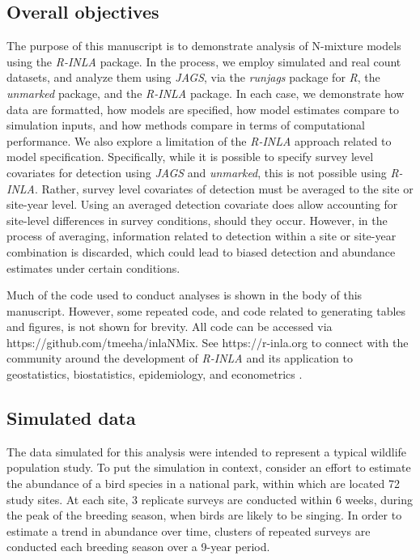 \documentclass{article}
\begin{document}
\subsection[Overall objectives]{Overall objectives}
The purpose of this manuscript is to demonstrate analysis of N-mixture models using the \emph{R-INLA} package. In the process, we employ simulated and real count datasets, and analyze them using \emph{JAGS}, via the \emph{runjags} package \citep{Denwood_2016} for \emph{R}, the \emph{unmarked} package, and the \emph{R-INLA} package. In each case, we demonstrate how data are formatted, how models are specified, how model estimates compare to simulation inputs, and how methods compare in terms of computational performance. We also explore a limitation of the \emph{R-INLA} approach related to model specification. Specifically, while it is possible to specify survey level covariates for detection using \emph{JAGS} and \emph{unmarked}, this is not possible using \emph{R-INLA}. Rather, survey level covariates of detection must be averaged to the site or site-year level. Using an averaged detection covariate does allow accounting for site-level differences in survey conditions, should they occur. However, in the process of averaging, information related to detection within a site or site-year combination is discarded, which could lead to biased detection and abundance estimates under certain conditions.

Much of the code used to conduct analyses is shown in the body of this manuscript. However, some repeated code, and code related to generating tables and figures, is not shown for brevity. All code can be accessed via https://github.com/tmeeha/inlaNMix. See https://r-inla.org to connect with the community around the development of \emph{R-INLA} and its application to geostatistics, biostatistics, epidemiology, and econometrics \citep{Lindgren_Rue_2015,Blangiardo_Cameletti_2015}.

\subsection[Simulated data]{Simulated data}
The data simulated for this analysis were intended to represent a typical wildlife population study. To put the simulation in context, consider an effort to estimate the abundance of a bird species in a national park, within which are located 72 study sites. At each site, 3 replicate surveys are conducted within 6 weeks, during the peak of the breeding season, when birds are likely to be singing. In order to estimate a trend in abundance over time, clusters of repeated surveys are conducted each breeding season over a 9-year period.
\end{document}
